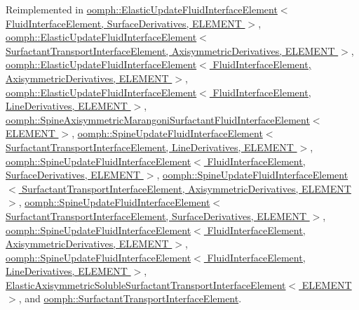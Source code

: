 Reimplemented in \hyperlink{classoomph_1_1ElasticUpdateFluidInterfaceElement_a15c3d2912325ace17676366c1469121f}{oomph\+::\+Elastic\+Update\+Fluid\+Interface\+Element$<$ Fluid\+Interface\+Element, Surface\+Derivatives, E\+L\+E\+M\+E\+N\+T $>$}, \hyperlink{classoomph_1_1ElasticUpdateFluidInterfaceElement_a15c3d2912325ace17676366c1469121f}{oomph\+::\+Elastic\+Update\+Fluid\+Interface\+Element$<$ Surfactant\+Transport\+Interface\+Element, Axisymmetric\+Derivatives, E\+L\+E\+M\+E\+N\+T $>$}, \hyperlink{classoomph_1_1ElasticUpdateFluidInterfaceElement_a15c3d2912325ace17676366c1469121f}{oomph\+::\+Elastic\+Update\+Fluid\+Interface\+Element$<$ Fluid\+Interface\+Element, Axisymmetric\+Derivatives, E\+L\+E\+M\+E\+N\+T $>$}, \hyperlink{classoomph_1_1ElasticUpdateFluidInterfaceElement_a15c3d2912325ace17676366c1469121f}{oomph\+::\+Elastic\+Update\+Fluid\+Interface\+Element$<$ Fluid\+Interface\+Element, Line\+Derivatives, E\+L\+E\+M\+E\+N\+T $>$}, \hyperlink{classoomph_1_1SpineAxisymmetricMarangoniSurfactantFluidInterfaceElement_a56c90572b8969dff01a4baa9de850d91}{oomph\+::\+Spine\+Axisymmetric\+Marangoni\+Surfactant\+Fluid\+Interface\+Element$<$ E\+L\+E\+M\+E\+N\+T $>$}, \hyperlink{classoomph_1_1SpineUpdateFluidInterfaceElement_a3958845051cafecd8e73745fc04c7a78}{oomph\+::\+Spine\+Update\+Fluid\+Interface\+Element$<$ Surfactant\+Transport\+Interface\+Element, Line\+Derivatives, E\+L\+E\+M\+E\+N\+T $>$}, \hyperlink{classoomph_1_1SpineUpdateFluidInterfaceElement_a3958845051cafecd8e73745fc04c7a78}{oomph\+::\+Spine\+Update\+Fluid\+Interface\+Element$<$ Fluid\+Interface\+Element, Surface\+Derivatives, E\+L\+E\+M\+E\+N\+T $>$}, \hyperlink{classoomph_1_1SpineUpdateFluidInterfaceElement_a3958845051cafecd8e73745fc04c7a78}{oomph\+::\+Spine\+Update\+Fluid\+Interface\+Element$<$ Surfactant\+Transport\+Interface\+Element, Axisymmetric\+Derivatives, E\+L\+E\+M\+E\+N\+T $>$}, \hyperlink{classoomph_1_1SpineUpdateFluidInterfaceElement_a3958845051cafecd8e73745fc04c7a78}{oomph\+::\+Spine\+Update\+Fluid\+Interface\+Element$<$ Surfactant\+Transport\+Interface\+Element, Surface\+Derivatives, E\+L\+E\+M\+E\+N\+T $>$}, \hyperlink{classoomph_1_1SpineUpdateFluidInterfaceElement_a3958845051cafecd8e73745fc04c7a78}{oomph\+::\+Spine\+Update\+Fluid\+Interface\+Element$<$ Fluid\+Interface\+Element, Axisymmetric\+Derivatives, E\+L\+E\+M\+E\+N\+T $>$}, \hyperlink{classoomph_1_1SpineUpdateFluidInterfaceElement_a3958845051cafecd8e73745fc04c7a78}{oomph\+::\+Spine\+Update\+Fluid\+Interface\+Element$<$ Fluid\+Interface\+Element, Line\+Derivatives, E\+L\+E\+M\+E\+N\+T $>$}, \hyperlink{classElasticAxisymmetricSolubleSurfactantTransportInterfaceElement_a054c0dfcc88814e128318c7ad30e6e31}{Elastic\+Axisymmetric\+Soluble\+Surfactant\+Transport\+Interface\+Element$<$ E\+L\+E\+M\+E\+N\+T $>$}, and \hyperlink{classoomph_1_1SurfactantTransportInterfaceElement_adedf33390efdf652e169f8bd38eb2350}{oomph\+::\+Surfactant\+Transport\+Interface\+Element}.



